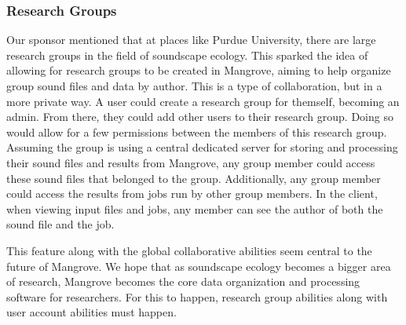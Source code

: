 \subsubsection{Research Groups}
Our sponsor mentioned that at places like Purdue University, there are large research groups in the field of soundscape ecology. This sparked the idea of allowing for research groups to be created in Mangrove, aiming to help organize group sound files and data by author. This is a type of collaboration, but in a more private way. A user could create a research group for themself, becoming an admin. From there, they could add other users to their research group. Doing so would allow for a few permissions between the members of this research group. Assuming the group is using a central dedicated server for storing and processing their sound files and results from Mangrove, any group member could access these sound files that belonged to the group. Additionally, any group member could access the results from jobs run by other group members. In the client, when viewing input files and jobs, any member can see the author of both the sound file and the job.\par
This feature along with the global collaborative abilities seem central to the future of Mangrove. We hope that as soundscape ecology becomes a bigger area of research, Mangrove becomes the core data organization and processing software for researchers. For this to happen, research group abilities along with user account abilities must happen.\\
